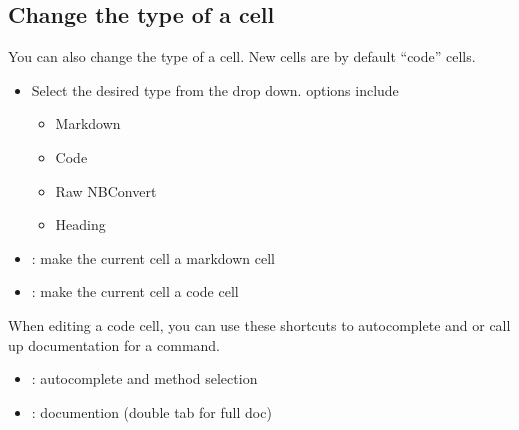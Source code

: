 \documentclass[letterpaper,10pt,english]{jupyterBook}
\begin{document}
\subsection{Change the type of a cell}
\label{\detokenize{content/04_PythonEssentials/Intro_Jupyter_notebook:change-the-type-of-a-cell}}
\sphinxAtStartPar
You can also change the type of a cell. New cells are by default “code” cells.

\sphinxAtStartPar
{}
\begin{itemize}
\item {} 
\sphinxAtStartPar
Select the desired type from the drop down.  options include
\begin{itemize}
\item {} 
\sphinxAtStartPar
Markdown

\item {} 
\sphinxAtStartPar
Code

\item {} 
\sphinxAtStartPar
Raw NBConvert

\item {} 
\sphinxAtStartPar
Heading

\end{itemize}

\end{itemize}

\sphinxAtStartPar
{}
\begin{itemize}
\item {} 
\sphinxAtStartPar
{}: make the current cell a markdown cell

\item {} 
\sphinxAtStartPar
{}: make the current cell a code  cell

\end{itemize}

\sphinxAtStartPar
{}

\sphinxAtStartPar
When editing a code cell, you can use these short\sphinxhyphen{}cuts to autocomplete and or call up documentation for a command.
\begin{itemize}
\item {} 
\sphinxAtStartPar
{}: autocomplete and  method selection

\item {} 
\sphinxAtStartPar
{}: documention (double tab for full doc)

\end{itemize}
\end{document}
